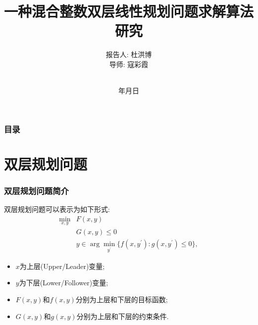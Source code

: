 \documentclass[10pt]{beamer}
\renewcommand{\today}{\number\year 年\number\month 月\number\day 日}
\begin{document}
\justifying
\title[一种混合整数双层线性规划问题求解算法研究]%
{一种混合整数双层线性规划问题求解算法研究}

\author[杜洪博]%
{报告人: 杜洪博\\
导\quad 师: 寇彩霞\rule[0pt]{0pt}{20pt}\\}

\institute[BUPT]{\textcolor[rgb]{0.0,0.0,0.10}%
{\small\ttfamily 北京邮电大学\ 理学院\\[10pt]}}

\date{\today}

\begin{frame}[plain]
	\titlepage
\end{frame}

\begin{frame}
	\frametitle{目录}
	\tableofcontents[hideallsubsections] %
\end{frame}

\AtBeginSection[] %
{ \begin{frame}<beamer> %
		\tableofcontents[currentsection,hideallsubsections]%
	\end{frame}
}


\section{双层规划问题}

\begin{frame}
	\frametitle{双层规划问题简介}
	双层规划问题可以表示为如下形式: 
	\begin{equation}
		\begin{aligned}
			\min_{x,y}& F(x,y)  \\
			&G(x,y)\leq0 \\
			&y\in\arg\operatorname*{min}_{y^{\prime}}\{f(x,y^{\prime}):g(x,y^{\prime})\leq0\},
		\end{aligned}
	\end{equation}
	\begin{itemize}
		\item $x$为上层(Upper/Leader)变量;
		\item $y$为下层(Lower/Follower)变量;
		\item $F(x,y)$和$f(x,y)$分别为上层和下层的目标函数;
		\item $G(x,y)$和$g(x,y)$分别为上层和下层的约束条件.
	\end{itemize}
\end{frame}
\end{document}
